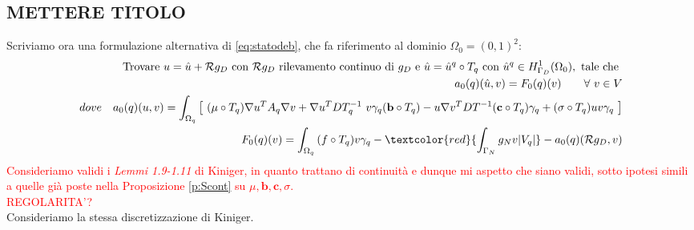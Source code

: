 \subsection{METTERE TITOLO}
Scriviamo ora una formulazione alternativa di \eqref{eq:statodeb}, che fa riferimento al dominio $\Omega_0=(0,1)^2$:
\begin{equation}
	\begin{aligned}
\text{Trovare } u = \hat{u}+\mathcal{R}g_D \text{ con } \mathcal{R}g_D \text{ rilevamento continuo di } g_D \text{ e } \hat{u}=\hat{u}^q\circ T_q\text{ con }\hat{u}^q\in H^1_{\Gamma_D}(\Omega_0), \text{ tale che } \\
	 a_0(q)(\hat{u},v)=F_0(q)(v)\qquad\forall\ v\in V\\
	dove\quad a_0(q)(u,v)=\int_{\Omega_q}{\left[\ (\mu\circ T_q)\nabla u^TA_q\nabla v +\nabla u^T DT_q^{-1}\ v \gamma_q (\mathbf{b}\circ T_q)-u \nabla v^T DT^{-1}(\mathbf{c}\circ T_q)\gamma_q+(\sigma\circ T_q) u v\gamma_q\ \right]}\\
	\qquad F_0(q)(v) = \int_{\Omega_q}{(f\circ T_q) v\gamma_q}-\textcolor{red}{\int_{\Gamma_N} {g_N v |V_q|}}-a_0(q)(\mathcal{R}g_D,v)
	\end{aligned}
\label{eq:statodebT}
\end{equation}
\textcolor{red}{Consideriamo validi i \emph{Lemmi 1.9-1.11} di Kiniger, in quanto trattano di continuit\`a e dunque mi aspetto che siano validi, sotto ipotesi simili a quelle gi\`a poste nella Proposizione \ref{p:Scont} su $\mu,\mathbf{b},\mathbf{c},\sigma$.}\\
\textcolor{red}{REGOLARITA'?}\\
Consideriamo la stessa discretizzazione di Kiniger.\\


